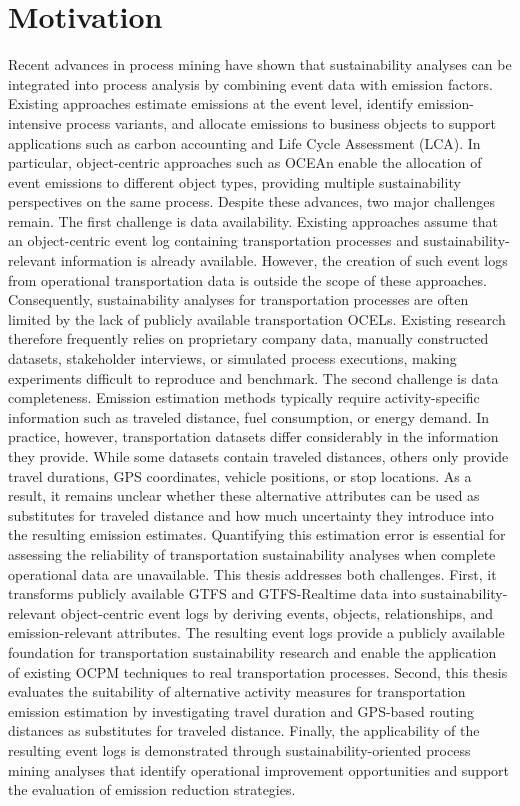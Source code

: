 \section{Motivation}
\label{sec:intro_ssec:motiv}
Recent advances in process mining have shown that sustainability analyses can be integrated into process analysis by combining event data with emission factors. Existing approaches estimate emissions at the event level, identify emission-intensive process variants, and allocate emissions to business objects to support applications such as carbon accounting and Life Cycle Assessment (LCA). In particular, object-centric approaches such as OCEAn \cite{ocean} enable the allocation of event emissions to different object types, providing multiple sustainability perspectives on the same process.
Despite these advances, two major challenges remain.
The first challenge is data availability. Existing approaches assume that an object-centric event log containing transportation processes and sustainability-relevant information is already available. However, the creation of such event logs from operational transportation data is outside the scope of these approaches. Consequently, sustainability analyses for transportation processes are often limited by the lack of publicly available transportation OCELs. Existing research therefore frequently relies on proprietary company data, manually constructed datasets, stakeholder interviews, or simulated process executions, making experiments difficult to reproduce and benchmark.
The second challenge is data completeness. Emission estimation methods typically require activity-specific information such as traveled distance, fuel consumption, or energy demand. In practice, however, transportation datasets differ considerably in the information they provide. While some datasets contain traveled distances, others only provide travel durations, GPS coordinates, vehicle positions, or stop locations. As a result, it remains unclear whether these alternative attributes can be used as substitutes for traveled distance and how much uncertainty they introduce into the resulting emission estimates. Quantifying this estimation error is essential for assessing the reliability of transportation sustainability analyses when complete operational data are unavailable.
This thesis addresses both challenges. First, it transforms publicly available GTFS and GTFS-Realtime data into sustainability-relevant object-centric event logs by deriving events, objects, relationships, and emission-relevant attributes. The resulting event logs provide a publicly available foundation for transportation sustainability research and enable the application of existing OCPM techniques to real transportation processes. Second, this thesis evaluates the suitability of alternative activity measures for transportation emission estimation by investigating travel duration and GPS-based routing distances as substitutes for traveled distance. Finally, the applicability of the resulting event logs is demonstrated through sustainability-oriented process mining analyses that identify operational improvement opportunities and support the evaluation of emission reduction strategies.

